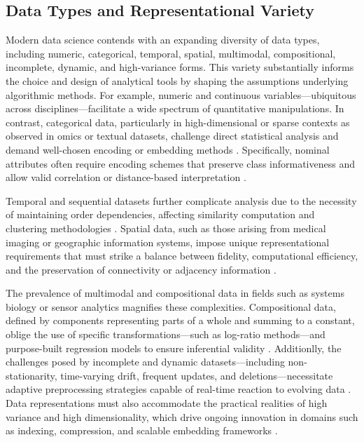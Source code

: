 \documentclass[sigconf]{acmart}
\begin{document}
\subsection{Data Types and Representational Variety}

Modern data science contends with an expanding diversity of data types, including numeric, categorical, temporal, spatial, multimodal, compositional, incomplete, dynamic, and high-variance forms. This variety substantially informs the choice and design of analytical tools by shaping the assumptions underlying algorithmic methods. For example, numeric and continuous variables—ubiquitous across disciplines—facilitate a wide spectrum of quantitative manipulations. In contrast, categorical data, particularly in high-dimensional or sparse contexts as observed in omics or textual datasets, challenge direct statistical analysis and demand well-chosen encoding or embedding methods \cite{ref61,ref62,ref63}. Specifically, nominal attributes often require encoding schemes that preserve class informativeness and allow valid correlation or distance-based interpretation \cite{ref61}.

Temporal and sequential datasets further complicate analysis due to the necessity of maintaining order dependencies, affecting similarity computation and clustering methodologies \cite{ref64,ref65}. Spatial data, such as those arising from medical imaging or geographic information systems, impose unique representational requirements that must strike a balance between fidelity, computational efficiency, and the preservation of connectivity or adjacency information \cite{ref67,ref68,ref69,ref70}.

The prevalence of multimodal and compositional data in fields such as systems biology or sensor analytics magnifies these complexities. Compositional data, defined by components representing parts of a whole and summing to a constant, oblige the use of specific transformations—such as log-ratio methods—and purpose-built regression models to ensure inferential validity \cite{ref90,ref92,ref94}. Additionlly, the challenges posed by incomplete and dynamic datasets—including non-stationarity, time-varying drift, frequent updates, and deletions—necessitate adaptive preprocessing strategies capable of real-time reaction to evolving data \cite{ref66,ref70,ref76,ref77,ref78,ref86}. Data representations must also accommodate the practical realities of high variance and high dimensionality, which drive ongoing innovation in domains such as indexing, compression, and scalable embedding frameworks \cite{ref69,ref70,ref78,ref86,ref90}.
\end{document}
